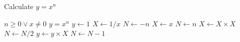 \documentclass{article}
\begin{document}
\begin{algorithm}
	\caption{Calculate $y = x^n$}
	\label{alg1}
	\begin{algorithmic}
		\REQUIRE $n \geq 0 \vee x \neq 0$
		\ENSURE $y = x^n$
		\STATE $y \leftarrow 1$
		\STATE $X \leftarrow 1 / x$
		\STATE $N \leftarrow -n$
		\ELSE
		\STATE $X \leftarrow x$
		\STATE $N \leftarrow n$
		\ENDIF
		\STATE $X \leftarrow X \times X$
		\STATE $N \leftarrow N / 2$
		\ELSE[$N$ is odd]
		\STATE $y \leftarrow y \times X$
		\STATE $N \leftarrow N - 1$
		\ENDIF
		\ENDWHILE
	\end{algorithmic}
\end{algorithm}






\end{document}
